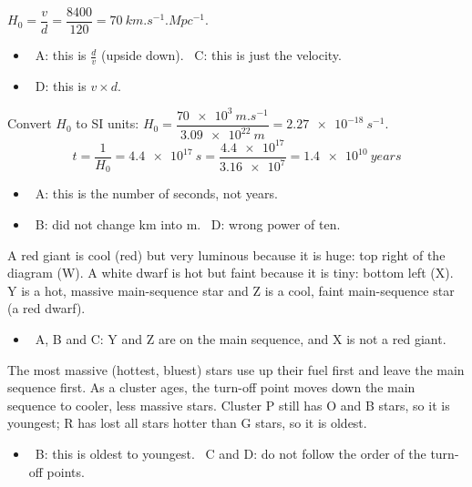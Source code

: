 \documentclass[12pt]{article}
\begin{document}
\begin{practiceanswers}
\begin{practiceans}
  $H_0 = \dfrac{v}{d} = \dfrac{8400}{120} = \qty{70}{km.s^{-1}.Mpc^{-1}}$.
  \begin{itemize}
    \item \xmark\ A: this is $\frac{d}{v}$ (upside down). \quad \xmark\ C: this is just the velocity.
    \item \xmark\ D: this is $v \times d$.
  \end{itemize}
\end{practiceans}

\begin{practiceans}
  Convert $H_0$ to SI units: $H_0 = \dfrac{\qty{70e3}{m.s^{-1}}}{\qty{3.09e22}{m}} = \qty{2.27e-18}{s^{-1}}$.
  \[ t = \frac{1}{H_0} = \qty{4.4e17}{s} = \frac{\num{4.4e17}}{\num{3.16e7}} = \qty{1.4e10}{years} \]
  \begin{itemize}
    \item \xmark\ A: this is the number of seconds, not years.
    \item \xmark\ B: did not change km into m. \quad \xmark\ D: wrong power of ten.
  \end{itemize}
\end{practiceans}

\begin{practiceans}
  A red giant is cool (red) but very luminous because it is huge: top right of the diagram (W). A white
  dwarf is hot but faint because it is tiny: bottom left (X). Y is a hot, massive main-sequence star and
  Z is a cool, faint main-sequence star (a red dwarf).
  \begin{itemize}
    \item \xmark\ A, B and C: Y and Z are on the main sequence, and X is not a red giant.
  \end{itemize}
\end{practiceans}

\begin{practiceans}
  The most massive (hottest, bluest) stars use up their fuel first and leave the main sequence first.
  As a cluster ages, the turn-off point moves down the main sequence to cooler, less massive stars.
  Cluster P still has O and B stars, so it is youngest; R has lost all stars hotter than G stars, so it
  is oldest.
  \begin{itemize}
    \item \xmark\ B: this is oldest to youngest. \quad \xmark\ C and D: do not follow the order of the
          turn-off points.
  \end{itemize}
\end{practiceans}


\end{practiceanswers}
\end{document}
